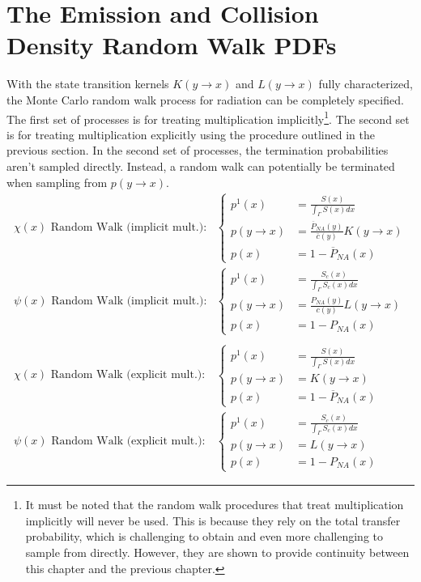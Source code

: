 \section{The Emission and Collision Density Random Walk PDFs}
With the state transition kernels $K(y \to x)$ and $L(y \to x)$ fully 
characterized, the Monte Carlo random walk process for radiation can 
be completely specified. The first set of processes is for treating 
multiplication implicitly\footnote{It must be noted that the random walk 
procedures that treat multiplication implicitly will never be used. This is 
because they rely on the total transfer probability, which is challenging to 
obtain and even more challenging to sample from directly. However, they are 
shown to provide continuity between this chapter and the previous chapter.}. 
The second set is for treating multiplication explicitly using the procedure 
outlined in the previous section. In the second set of processes, the 
termination probabilities aren't sampled directly. Instead, a random walk can 
potentially be terminated when sampling from $p(y \to x)$.
\begin{align}
  \chi(x)\text{ Random Walk (implicit mult.):}&
  \begin{cases}
    p^1(x) & = \frac{S(x)}{\int_{\Gamma} S(x)dx} \\
    p(y \to x) &  = \frac{\overline{P}_{NA}(y)}{\bar{c}(y)}K(y \to x) \\
    p(x) & = 1 - \overline{P}_{NA}(x)
  \end{cases} \\
  \psi(x)\text{ Random Walk (implicit mult.):}&
  \begin{cases}
    p^1(x) & = \frac{S_c(x)}{\int_{\Gamma} S_c(x)dx} \\
    p(y \to x) & = \frac{P_{NA}(y)}{c(y)}L(y \to x) \\
    p(x) & = 1 - P_{NA}(x)
  \end{cases} \\
  \nonumber \\
  \chi(x)\text{ Random Walk (explicit mult.):} &
  \begin{cases}
    p^1(x) & = \frac{S(x)}{\int_{\Gamma} S(x)dx} \\
    p(y \to x) &  = K(y \to x) \\
    p(x) & = 1 - \overline{P}_{NA}(x)
  \end{cases}
  \label{eq:mc_random_walk_emission_dens} \\
  \psi(x)\text{ Random Walk (explicit mult.):} &
  \begin{cases}
    p^1(x) & = \frac{S_c(x)}{\int_{\Gamma} S_c(x)dx} \\
    p(y \to x) & = L(y \to x) \\
    p(x) & = 1 - P_{NA}(x)
  \end{cases}
  \label{eq:mc_random_walk_collision_dens}
\end{align}

